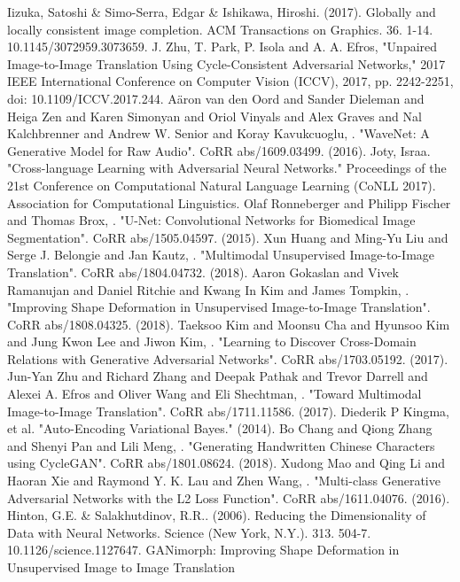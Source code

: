 \documentclass[12pt]{report}
\begin{document}
\begin{thebibliography}{9}
	 Iizuka, Satoshi \& Simo-Serra, Edgar \& Ishikawa, Hiroshi. (2017). Globally and locally consistent image completion. ACM Transactions on Graphics. 36. 1-14. 10.1145/3072959.3073659. 
	J. Zhu, T. Park, P. Isola and A. A. Efros, "Unpaired Image-to-Image Translation Using Cycle-Consistent Adversarial Networks," 2017 IEEE International Conference on Computer Vision (ICCV), 2017, pp. 2242-2251, doi: 10.1109/ICCV.2017.244.
	 Aäron van den Oord and Sander Dieleman and Heiga Zen and Karen Simonyan and Oriol Vinyals and Alex Graves and Nal Kalchbrenner and Andrew W. Senior and Koray Kavukcuoglu, . "WaveNet: A Generative Model for Raw Audio". CoRR abs/1609.03499. (2016).
	 Joty, Israa. "Cross-language Learning with Adversarial Neural Networks." Proceedings of the 21st Conference on Computational Natural Language Learning (CoNLL 2017). Association for Computational Linguistics.
	 Olaf Ronneberger and Philipp Fischer and Thomas Brox, . "U-Net: Convolutional Networks for Biomedical Image Segmentation". CoRR abs/1505.04597. (2015).
	 Xun Huang and Ming-Yu Liu and Serge J. Belongie and Jan Kautz, . "Multimodal Unsupervised Image-to-Image Translation". CoRR abs/1804.04732. (2018).
	 Aaron Gokaslan and Vivek Ramanujan and Daniel Ritchie and Kwang In Kim and James Tompkin, . "Improving Shape Deformation in Unsupervised Image-to-Image Translation". CoRR abs/1808.04325. (2018).
	 Taeksoo Kim and Moonsu Cha and Hyunsoo Kim and Jung Kwon Lee and Jiwon Kim, . "Learning to Discover Cross-Domain Relations with Generative Adversarial Networks". CoRR abs/1703.05192. (2017).
	 Jun-Yan Zhu and Richard Zhang and Deepak Pathak and Trevor Darrell and Alexei A. Efros and Oliver Wang and Eli Shechtman, . "Toward Multimodal Image-to-Image Translation". CoRR abs/1711.11586. (2017).
	 Diederik P Kingma, et al. "Auto-Encoding Variational Bayes." (2014). 
	 Bo Chang and Qiong Zhang and Shenyi Pan and Lili Meng, . "Generating Handwritten Chinese Characters using CycleGAN". CoRR abs/1801.08624. (2018).
	 Xudong Mao and Qing Li and Haoran Xie and Raymond Y. K. Lau and Zhen Wang, . "Multi-class Generative Adversarial Networks with the L2 Loss Function". CoRR abs/1611.04076. (2016).
	Hinton, G.E. \& Salakhutdinov, R.R.. (2006). Reducing the Dimensionality of Data with Neural Networks. Science (New York, N.Y.). 313. 504-7. 10.1126/science.1127647. 
	 GANimorph: Improving Shape Deformation in Unsupervised Image to Image Translation

\end{thebibliography}
\end{document}
